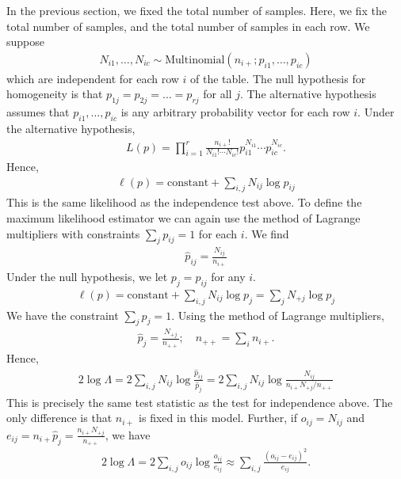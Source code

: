 \begin{example}
	In the previous section, we fixed the total number of samples.
	Here, we fix the total number of samples, and the total number of samples in each row.
	We suppose
	\begin{align*}
		N_{i1}, \dots, N_{ic} \sim \mathrm{Multinomial}(n_{i+}; p_{i1}, \dots, p_{ic})
	\end{align*}
	which are independent for each row $i$ of the table.
	The null hypothesis for homogeneity is that $p_{1j} = p_{2j} = \dots = p_{rj}$ for all $j$.
	The alternative hypothesis assumes that $p_{i1}, \dots, p_{ic}$ is any arbitrary probability vector for each row $i$.
	Under the alternative hypothesis,
	\begin{align*}
		L(p) = \prod_{i=1}^r \frac{n_{i+}!}{N_{i1}!
			\cdots N_{ic}!} p_{i1}^{N_{i1}} \cdots p_{ic}^{N_{ic}}.
	\end{align*}
	Hence,
	\begin{align*}
		\ell(p) = \text{constant} + \sum_{i,j} N_{ij} \log p_{ij}
	\end{align*}
	This is the same likelihood as the independence test above.
	To define the maximum likelihood estimator we can again use the method of Lagrange multipliers with constraints $\sum_j p_{ij} = 1$ for each $i$.
	We find
	\begin{align*}
		\hat p_{ij} = \frac{N_{ij}}{n_{i+}}
	\end{align*}
	Under the null hypothesis, we let $p_j = p_{ij}$ for any $i$.
	\begin{align*}
		\ell(p) = \text{constant} + \sum_{i,j} N_{ij} \log p_j = \sum_j N_{+j} \log p_j
	\end{align*}
	We have the constraint $\sum_j p_j = 1$.
	Using the method of Lagrange multipliers,
	\begin{align*}
		\hat p_j = \frac{N_{+j}}{n_{++}};\quad n_{++} = \sum_i n_{i+}.
	\end{align*}
	Hence,
	\begin{align*}
		2 \log \Lambda = 2 \sum_{i,j} N_{ij} \log \frac{\hat p_{ij}}{\hat p_j} = 2 \sum_{i,j} N_{ij} \log \frac{N_{ij}}{n_{i+} N_{+j} / n_{++}}
	\end{align*}
	This is precisely the same test statistic as the test for independence above.
	The only difference is that $n_{i+}$ is fixed in this model.
	Further, if $o_{ij} = N_{ij}$ and $e_{ij} = n_{i+} \hat p_j = \frac{n_{i+} N_{+j}}{n_{++}}$, we have
	\begin{align*}
		2 \log \Lambda = 2 \sum_{i,j} o_{ij} \log \frac{o_{ij}}{e_{ij}} \approx \sum_{i,j} \frac{(o_{ij} - e_{ij})^2}{e_{ij}}.

\end{align*}
\end{example}

